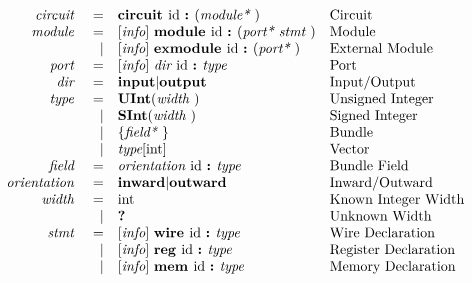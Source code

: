 \documentclass[12pt]{article}
\begin{document}
\[
\begin{array}{rrll}
\text{\em circuit\ }    &=     &\text{\bf circuit\ } \text{id } \text{\bf :\ } (\text{\em module*\ })                                        &\text{Circuit}\\
\text{\em module\ }     &=     &[\text{\em info}]\  \text{\bf module\ }  \text{id } \text{\bf :\ } (\text{\em port*\ } \text{\em stmt\ })                          &\text{Module}\\
                &\vert &[\text{\em info}]\  \text{\bf exmodule\ }  \text{id } \text{\bf :\ } (\text{\em port*\ })                                  &\text{External Module}\\
\text{\em port\ }       &=     &[\text{\em info}]\  \text{\em dir\ } \text{id } \text{\bf :\ } \text{\em type\ }                                           &\text{Port}\\
\text{\em dir\ }        &=     &\text{\bf input} \vert \text{\bf output}                                                &\text{Input/Output}\\
\text{\em type\ }       &=     &\text{\bf UInt}(\text{\em width\ })                                                        &\text{Unsigned Integer}\\
                &\vert &\text{\bf SInt}(\text{\em width\ })                                                        &\text{Signed Integer}\\
                &\vert &\{\text{\em field*\ }\}                                                         &\text{Bundle}\\
                &\vert &\text{\em type}[\text{int}]                                                             &\text{Vector}\\
\text{\em field\ }      &=     &\text{\em orientation\ } \text{id } \text{\bf :\ } \text{\em type\ }                                                 &\text{Bundle Field}\\
\text{\em orientation\ }&=     &\text{\bf inward} \vert \text{\bf outward}                                                &\text{Inward/Outward}\\
\text{\em width\ }      &=     &\text{int}                                                                         &\text{Known Integer Width}\\
                &\vert &\text{\bf ?\ }                                                                        &\text{Unknown Width}\\
\text{\em stmt\ }       &=     &[\text{\em info}]\  \text{\bf wire\ } \text{id } \text{\bf :\ } \text{\em type\ }                                          &\text{Wire Declaration}\\
                &\vert &[\text{\em info}]\  \text{\bf reg\ } \text{id } \text{\bf :\ } \text{\em type\ }                                           &\text{Register Declaration}\\
                &\vert &[\text{\em info}]\  \text{\bf mem\ } \text{id } \text{\bf :\ } \text{\em type\ }                                           &\text{Memory Declaration}\\

\end{array}\]
\end{document}
